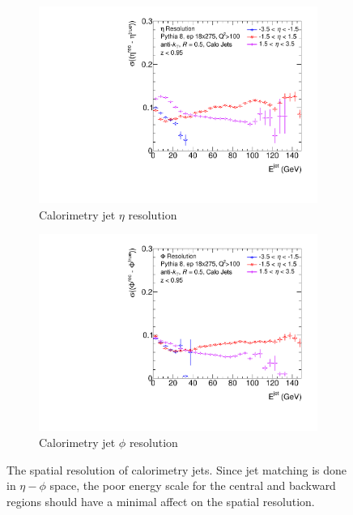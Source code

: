 


\begin{figure}
    \centering
    \begin{subfigure}{0.4\textwidth}
        \centering
        \includegraphics[width=\linewidth]{figs/Final_Plots/EtaReso_calo_grouped.pdf}
        \caption{Calorimetry jet $\eta$ resolution}
        \label{fig:calo_eta_resolution}
    \end{subfigure}
    \hfill
    \begin{subfigure}{0.4\textwidth}
        \centering
        \includegraphics[width=\linewidth]{figs/Final_Plots/PhiReso_calo_grouped.pdf}
        \caption{Calorimetry jet $\phi$ resolution}
        \label{fig:calo_phi_resolution}
    \end{subfigure}
    \caption{The spatial resolution of calorimetry jets.  Since jet matching is done in $\eta-\phi$ space, the poor energy scale for the central and backward regions should have a minimal affect on the spatial resolution.}
    \label{fig:calo_spatial_reso_scale}
\end{figure}

